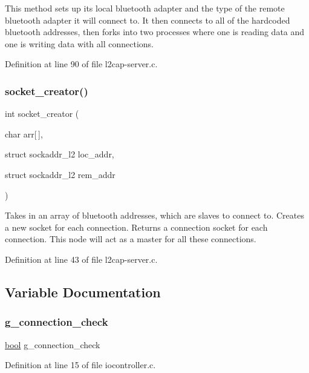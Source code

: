 This method sets up its local bluetooth adapter and the type of the remote bluetooth adapter it will connect to. It then connects to all of the hardcoded bluetooth addresses, then forks into two processes where one is reading data and one is writing data with all connections. 

Definition at line 90 of file l2cap-\/server.\+c.

\mbox{\label{piconet_2l2cap-server_8c_a5481465d905370f659d6592b0fa4bd0d}} 
\subsubsection{\texorpdfstring{socket\+\_\+creator()}{socket\_creator()}}
{\footnotesize\ttfamily int socket\+\_\+creator (\begin{DoxyParamCaption}\item[{char}]{arr\mbox{[}$\,$\mbox{]},  }\item[{struct sockaddr\+\_\+l2}]{loc\+\_\+addr,  }\item[{struct sockaddr\+\_\+l2}]{rem\+\_\+addr }\end{DoxyParamCaption})}

Takes in an array of bluetooth addresses, which are slaves to connect to. Creates a new socket for each connection. Returns a connection socket for each connection. This node will act as a master for all these connections. 

Definition at line 43 of file l2cap-\/server.\+c.



\subsection{Variable Documentation}
\mbox{\label{piconet_2l2cap-server_8c_a81bc6941c354c1be6ad9931b4f2b50bf}} 
\subsubsection{\texorpdfstring{g\+\_\+connection\+\_\+check}{g\_connection\_check}}
{\footnotesize\ttfamily \mbox{\hyperlink{piconet_2l2cap-client_8c_af6a258d8f3ee5206d682d799316314b1}{bool}} g\+\_\+connection\+\_\+check}



Definition at line 15 of file iocontroller.\+c.

